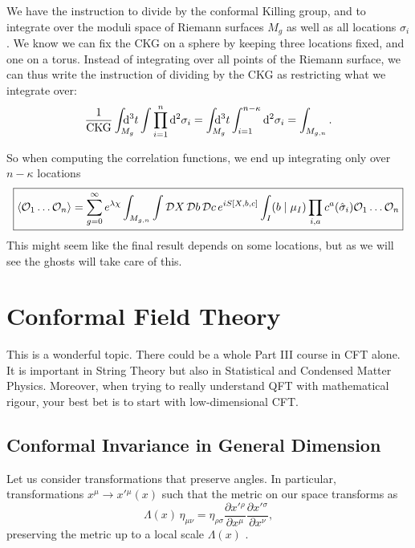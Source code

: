 \begin{remark}
  We have the instruction to divide by the conformal Killing group, and to integrate over the moduli space of Riemann surfaces $M_g$ as well as all locations $\sigma_i$. 
  We know we can fix the CKG on a sphere by keeping three locations fixed, and one on a torus.
  Instead of integrating over all points of the Riemann surface, we can thus write the instruction of dividing by the CKG as restricting what we integrate over:
  \begin{equation}
    \frac{1}{\text{CKG}} \int_{\mathrlap{M_g}} \dd[3]{t} \int \prod_{i=1}^n \dd[2]{\sigma_i} = \int_{\mathrlap{M_g}} \dd[3]{t} \int_{i=1}^{n-\kappa} \dd[2]{\sigma_i} = \int_{M_{g, n}}.
  \end{equation}
\end{remark}

So when computing the correlation functions, we end up integrating only over $n - \kappa$ locations
\begin{equation}
  \boxed{\langle \mathcal{O}_1 \dots \mathcal{O}_n \rangle = \sum_{g=0}^{\infty} e^{\lambda \chi} \int_{M_{g, n}} \int \pdd{X} \pdd{b} \pdd{c} e^{i S[X, b, c]} \int_I (b \suchthat \mu_I) \prod_{i, a} c^a (\hat{\sigma}_i) \mathcal{O}_1 \dots \mathcal{O}_n}
\end{equation}
This might seem like the final result depends on some locations, but as we will see the ghosts will take care of this.

\section{Conformal Field Theory}%
\label{sec:conformal_field_theory}

This is a wonderful topic. There could be a whole Part III course in CFT alone. It is important in String Theory but also in Statistical and Condensed Matter Physics.
Moreover, when trying to really understand QFT with mathematical rigour, your best bet is to start with low-dimensional CFT.

\subsection{Conformal Invariance in General Dimension}%
\label{sub:conformal_invariance_in_general_dimension}

Let us consider transformations that preserve angles. In particular, transformations $x^{\mu} \to x'{}^{\mu}(x)$  such that the metric on our space transforms as 
\begin{equation}
  \Lambda(x) \, \eta_{\mu\nu} = \eta_{\rho\sigma} \frac{\partial x'{}^{\rho}}{\partial x^{\mu}} \frac{\partial x'{}^{\sigma}}{\partial x^{\nu}},
\end{equation}
preserving the metric up to a local scale $\Lambda(x)$ .

